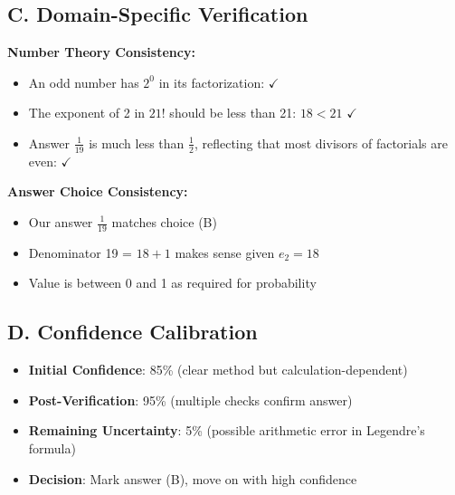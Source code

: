 \documentclass[]{article}
\begin{document}
\begin{verificationbox}
\subsection*{C. Domain-Specific Verification}

\textbf{Number Theory Consistency:}
\begin{itemize}[leftmargin=*]
    \item An odd number has $2^0$ in its factorization: $\checkmark$
    \item The exponent of 2 in $21!$ should be less than 21: $18 < 21$ $\checkmark$
    \item Answer $\frac{1}{19}$ is much less than $\frac{1}{2}$, reflecting that most divisors of factorials are even: $\checkmark$
\end{itemize}

\textbf{Answer Choice Consistency:}
\begin{itemize}[leftmargin=*]
    \item Our answer $\frac{1}{19}$ matches choice (B)
    \item Denominator 19 = $18 + 1$ makes sense given $e_2 = 18$
    \item Value is between 0 and 1 as required for probability
\end{itemize}

\subsection*{D. Confidence Calibration}
\begin{itemize}[leftmargin=*]
    \item \textbf{Initial Confidence}: 85\% (clear method but calculation-dependent)
    \item \textbf{Post-Verification}: 95\% (multiple checks confirm answer)
    \item \textbf{Remaining Uncertainty}: 5\% (possible arithmetic error in Legendre's formula)
    \item \textbf{Decision}: Mark answer (B), move on with high confidence
\end{itemize}
\end{verificationbox}
\end{document}
